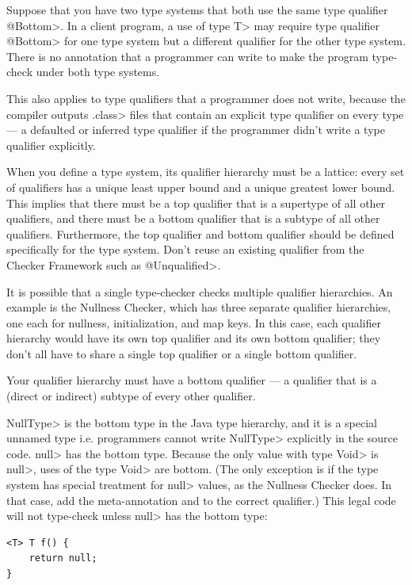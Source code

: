 Suppose that you have two type systems that both use the same type
qualifier \<@Bottom>.  In a client program, a use of type \<T> may require type
qualifier \<@Bottom> for one type system but a different qualifier for the other
type system.  There is no annotation that a programmer can write to make
the program type-check under both type systems.

This also applies to type qualifiers that a programmer does not write,
because the compiler outputs \<.class> files that contain an explicit type
qualifier on every type --- a defaulted or inferred type qualifier if the
programmer didn't write a type qualifier explicitly.



When you define a type system, its qualifier hierarchy must be a
lattice:  every set of qualifiers has a unique least upper bound and a unique
greatest lower bound.  This implies that there must be a top qualifier that is a
supertype of all other qualifiers, and there must be a bottom qualifier that is a
subtype of all other qualifiers.
Furthermore, the top qualifier and bottom qualifier should be defined
specifically for the type system.  Don't reuse an existing qualifier from the
Checker Framework such as \<@Unqualified>.

It is possible that a single type-checker checks multiple qualifier hierarchies.
An example is the Nullness Checker, which has three separate qualifier
hierarchies, one each for
nullness, initialization, and map keys.  In this case, each qualifier hierarchy
would have its own top qualifier and its own bottom qualifier; they don't
all have to share a single top qualifier or a single bottom qualifier.


Your qualifier hierarchy must have a bottom qualifier
--- a qualifier that is a (direct or indirect) subtype of every other
qualifier.

\<NullType> is the bottom type in the Java type hierarchy, and it is a special unnamed type i.e. programmers cannot write
\<NullType> explicitly in the source code.
\<null> has the bottom type. Because the only value with type \<Void> is \<null>, uses of the type \<Void> are bottom.
(The only exception is if the type system has special treatment for \<null> values, as the
Nullness Checker does. In that case, add the meta-annotation
and 
to the correct qualifier.)
This legal code
will not type-check unless \<null> has the bottom type:
\begin{Verbatim}
<T> T f() {
    return null;
}
\end{Verbatim}

